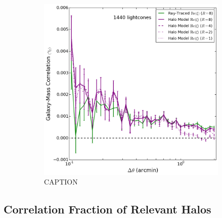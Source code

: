 \documentclass[%
 reprint,
 amsmath,amssymb,
 aps,nofootinbib
]{revtex4-1}
\begin{document}
\begin{figure}
\begin{subfigure}{0.475\textwidth}
        \includegraphics[width=\textwidth]{figs-swe/thesis/ng_progression.png}
        \captionsetup{justification=raggedright,singlelinecheck=false}
        \caption{CAPTION}
        \label{fig:ng_corr_series}
    \end{subfigure}
    \caption{}
\end{figure}
%

\subsection{Correlation Fraction of Relevant Halos} \label{halo_fraction}
\end{document}
